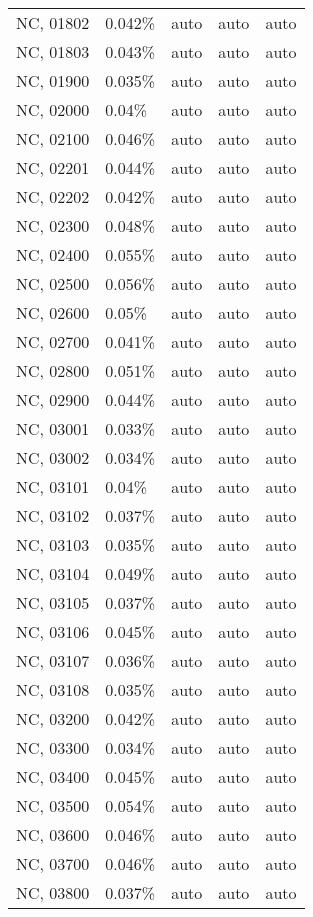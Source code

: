 \begin{longtable}[]{@{}lllll@{}}
NC, 01802 & 0.042\% & auto & auto & auto \\
NC, 01803 & 0.043\% & auto & auto & auto \\
NC, 01900 & 0.035\% & auto & auto & auto \\
NC, 02000 & 0.04\% & auto & auto & auto \\
NC, 02100 & 0.046\% & auto & auto & auto \\
NC, 02201 & 0.044\% & auto & auto & auto \\
NC, 02202 & 0.042\% & auto & auto & auto \\
NC, 02300 & 0.048\% & auto & auto & auto \\
NC, 02400 & 0.055\% & auto & auto & auto \\
NC, 02500 & 0.056\% & auto & auto & auto \\
NC, 02600 & 0.05\% & auto & auto & auto \\
NC, 02700 & 0.041\% & auto & auto & auto \\
NC, 02800 & 0.051\% & auto & auto & auto \\
NC, 02900 & 0.044\% & auto & auto & auto \\
NC, 03001 & 0.033\% & auto & auto & auto \\
NC, 03002 & 0.034\% & auto & auto & auto \\
NC, 03101 & 0.04\% & auto & auto & auto \\
NC, 03102 & 0.037\% & auto & auto & auto \\
NC, 03103 & 0.035\% & auto & auto & auto \\
NC, 03104 & 0.049\% & auto & auto & auto \\
NC, 03105 & 0.037\% & auto & auto & auto \\
NC, 03106 & 0.045\% & auto & auto & auto \\
NC, 03107 & 0.036\% & auto & auto & auto \\
NC, 03108 & 0.035\% & auto & auto & auto \\
NC, 03200 & 0.042\% & auto & auto & auto \\
NC, 03300 & 0.034\% & auto & auto & auto \\
NC, 03400 & 0.045\% & auto & auto & auto \\
NC, 03500 & 0.054\% & auto & auto & auto \\
NC, 03600 & 0.046\% & auto & auto & auto \\
NC, 03700 & 0.046\% & auto & auto & auto \\
NC, 03800 & 0.037\% & auto & auto & auto \\

\end{longtable}
